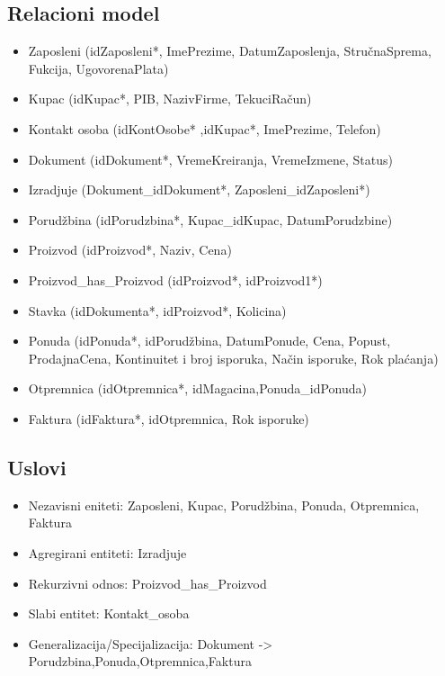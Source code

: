 \subsection{Relacioni model}
\begin{itemize}
\item Zaposleni (idZaposleni*, ImePrezime, DatumZaposlenja, StručnaSprema, Fukcija, UgovorenaPlata)
\item Kupac (idKupac*, PIB, NazivFirme, TekuciRačun)
\item Kontakt osoba (idKontOsobe* ,idKupac*, ImePrezime, Telefon)
\item Dokument (idDokument*, VremeKreiranja, VremeIzmene, Status)

\item Izradjuje (Dokument\_idDokument*, Zaposleni\_idZaposleni*)

\item Porudžbina (idPorudzbina*, Kupac\_idKupac, DatumPorudzbine)

\item Proizvod (idProizvod*, Naziv, Cena)

\item Proizvod\_has\_Proizvod (idProizvod*, idProizvod1*)

\item Stavka (idDokumenta*, idProizvod*, Kolicina)

\item Ponuda (idPonuda*, idPorudžbina, DatumPonude, Cena, Popust, ProdajnaCena, Kontinuitet i broj isporuka, Način isporuke, Rok plaćanja)

\item Otpremnica (idOtpremnica*, idMagacina,Ponuda\_idPonuda)

\item Faktura (idFaktura*, idOtpremnica, Rok isporuke)
\end{itemize}

\subsection{Uslovi}
\begin{itemize}
\item Nezavisni eniteti: Zaposleni, Kupac, Porudžbina, Ponuda, Otpremnica, Faktura

\item Agregirani entiteti: Izradjuje

\item Rekurzivni odnos: Proizvod\_has\_Proizvod

\item Slabi entitet: Kontakt\_osoba

\item Generalizacija/Specijalizacija: Dokument -> Porudzbina,Ponuda,Otpremnica,Faktura

\end{itemize}

